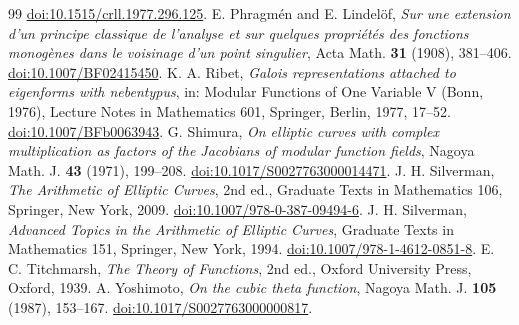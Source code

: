 \documentclass[11pt]{article}
\numberwithin{equation}{section}
\begin{document}
\begin{thebibliography}{99}
 \href{https://doi.org/10.1515/crll.1977.296.125}{doi:10.1515/crll.1977.296.125}.
 E. Phragm\'en and E. Lindel\"of, \emph{Sur une extension d'un principe classique de
 l'analyse et sur quelques propri\'et\'es des fonctions monog\`enes dans le voisinage d'un point
 singulier}, Acta Math. \textbf{31} (1908), 381--406.
 \href{https://doi.org/10.1007/BF02415450}{doi:10.1007/BF02415450}.
 K. A. Ribet, \emph{Galois representations attached to eigenforms with nebentypus},
 in: Modular Functions of One Variable V (Bonn, 1976), Lecture Notes in Mathematics 601, Springer,
 Berlin, 1977, 17--52. \href{https://doi.org/10.1007/BFb0063943}{doi:10.1007/BFb0063943}.
 G. Shimura, \emph{On elliptic curves with complex multiplication as factors of the
 Jacobians of modular function fields}, Nagoya Math. J. \textbf{43} (1971), 199--208.
 \href{https://doi.org/10.1017/S0027763000014471}{doi:10.1017/S0027763000014471}.
 J. H. Silverman, \emph{The Arithmetic of Elliptic Curves}, 2nd ed.,
 Graduate Texts in Mathematics 106, Springer, New York, 2009.
 \href{https://doi.org/10.1007/978-0-387-09494-6}{doi:10.1007/978-0-387-09494-6}.
 J. H. Silverman, \emph{Advanced Topics in the Arithmetic of Elliptic Curves},
 Graduate Texts in Mathematics 151, Springer, New York, 1994.
 \href{https://doi.org/10.1007/978-1-4612-0851-8}{doi:10.1007/978-1-4612-0851-8}.
 E. C. Titchmarsh, \emph{The Theory of Functions}, 2nd ed., Oxford University Press,
 Oxford, 1939.
 A. Yoshimoto, \emph{On the cubic theta function}, Nagoya Math. J. \textbf{105} (1987),
 153--167. \href{https://doi.org/10.1017/S0027763000000817}{doi:10.1017/S0027763000000817}.
\end{thebibliography}
\end{document}
